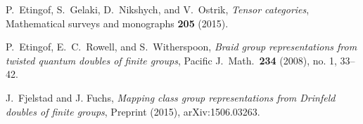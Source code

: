 \documentclass{amsart}
\begin{document}
\begin{thebibliography}{0}


 P.\ Etingof, S.\ Gelaki, D.\ Nikshych,  and V.\ Ostrik, \emph{Tensor categories}, Mathematical surveys and monographs \textbf{205} (2015).

 P.\ Etingof, E.\ C.\ Rowell, and S.\ Witherspoon, \emph{Braid group representations from twisted quantum doubles of finite groups}, Pacific J.\ Math.\ \textbf{234} (2008), no. 1, 33--42.

 J.\ Fjelstad and J. Fuchs, \emph{Mapping class group representations from {Drinfeld} doubles of finite groups}, Preprint (2015), arXiv:1506.03263.









\end{thebibliography}
\end{document}
